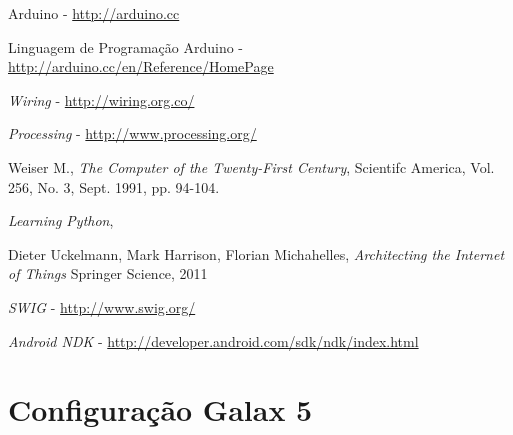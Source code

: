 \documentclass[12pt,a4paper,oneside]{report}
\begin{document}
\begin{thebibliography}{99}
	Arduino - \url{http://arduino.cc}
    
	Linguagem de Programação Arduino - \url{http://arduino.cc/en/Reference/HomePage}

	\emph{Wiring} - \url{http://wiring.org.co/}

	\emph{Processing} - \url{http://www.processing.org/}

	Weiser M.,
	\emph{The Computer of the Twenty-First Century},
	Scientifc America, Vol. 256, No. 3, Sept. 1991, pp. 94-104.

	\emph{Learning Python},
	
	Dieter Uckelmann, Mark Harrison, Florian Michahelles,
	\emph{Architecting the Internet of Things}
	Springer Science, 2011

	\emph{SWIG} - \url{http://www.swig.org/}

	\emph{Android NDK} - \url{http://developer.android.com/sdk/ndk/index.html}

\end{thebibliography}

\appendix

\chapter{Configuração Galax 5}
\label{chap:config-galax5}
\end{document}

